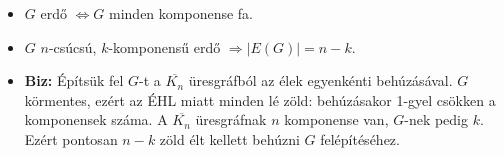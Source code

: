 \documentclass[../../szobeli.tex]{subfiles}
\begin{document}
\begin{itemize}
\begin{itemize}
            \item $G$ erdő $\Longleftrightarrow  G$ minden komponense fa.
            \item $G$ $n$-csúcsú, $k$-komponensű erdő $\Rightarrow |E(G)| = n-k$.
            \item \textbf{Biz:} Építsük fel $G$-t a $\overline{K_n}$ üresgráfból az élek egyenkénti behúzásával. $G$ körmentes, ezért az ÉHL miatt minden lé zöld: behúzásakor 1-gyel csökken a komponensek száma. A $\overline{K_n}$ üresgráfnak $n$ komponense van, $G$-nek pedig $k$. Ezért pontosan $n-k$ zöld élt kellett behúzni $G$ felépítéséhez.
        \end{itemize}
    \end{itemize}
\end{document}

